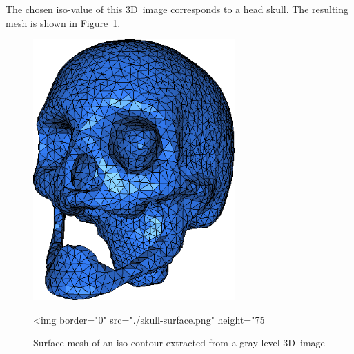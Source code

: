 The chosen iso-value of this 3D~image corresponds to a head skull. The
resulting mesh is shown in Figure~\ref{figure:Surface_mesher-skull}.

\begin{figure}[ht]
  \begin{center}
    \begin{ccTexOnly}
      \includegraphics[height=10cm]{Surface_mesher/skull-surface}
    \end{ccTexOnly}
    \begin{ccHtmlOnly}
      <img border="0" src="./skull-surface.png" height="75%
    \end{ccHtmlOnly}
  \end{center}
  \caption{Surface mesh of an iso-contour extracted from a gray level 3D~image}
  \label{figure:Surface_mesher-skull}
\end{figure}




